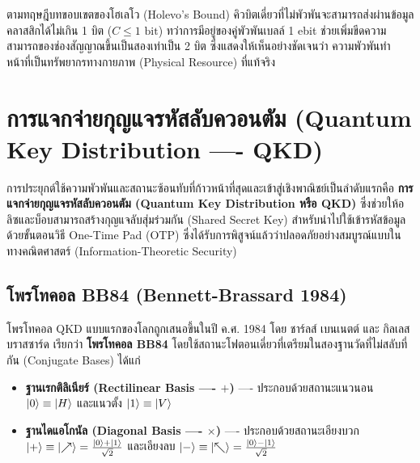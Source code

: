 ตามทฤษฎีบทขอบเขตของโฮเลโว (Holevo's Bound) คิวบิตเดี่ยวที่ไม่พัวพันจะสามารถส่งผ่านข้อมูลคลาสสิกได้ไม่เกิน 1 บิต ($C \le 1\text{ bit}$) ทว่าการมีอยู่ของคู่พัวพันเบลล์ 1 ebit ช่วยเพิ่มขีดความสามารถของช่องสัญญาณขึ้นเป็นสองเท่าเป็น 2 บิต ซึ่งแสดงให้เห็นอย่างชัดเจนว่า ความพัวพันทำหน้าที่เป็นทรัพยากรทางกายภาพ (Physical Resource) ที่แท้จริง

\section{การแจกจ่ายกุญแจรหัสลับควอนตัม (Quantum Key Distribution ---- QKD)}

การประยุกต์ใช้ความพัวพันและสถานะซ้อนทับที่ก้าวหน้าที่สุดและเข้าสู่เชิงพาณิชย์เป็นลำดับแรกคือ \textbf{การแจกจ่ายกุญแจรหัสลับควอนตัม (Quantum Key Distribution หรือ QKD)} ซึ่งช่วยให้อลิซและบ็อบสามารถสร้างกุญแจลับสุ่มร่วมกัน (Shared Secret Key) สำหรับนำไปใช้เข้ารหัสข้อมูลด้วยขั้นตอนวิธี One-Time Pad (OTP) ซึ่งได้รับการพิสูจน์แล้วว่าปลอดภัยอย่างสมบูรณ์แบบในทางคณิตศาสตร์ (Information-Theoretic Security)

\subsection{โพรโทคอล BB84 (Bennett-Brassard 1984)}
โพรโทคอล QKD แบบแรกของโลกถูกเสนอขึ้นในปี ค.ศ. 1984 โดย ชาร์ลส์ เบนเนตต์ และ กิลเลส บราสซาร์ด เรียกว่า \textbf{โพรโทคอล BB84} โดยใช้สถานะโฟตอนเดี่ยวที่เตรียมในสองฐานวัดที่ไม่สลับที่กัน (Conjugate Bases) ได้แก่
\begin{itemize}
    \item \textbf{ฐานเรกติลิเนียร์ (Rectilinear Basis ---- $+$)} ---- ประกอบด้วยสถานะแนวนอน $\ket{0} \equiv \ket{H}$ และแนวตั้ง $\ket{1} \equiv \ket{V}$
    \item \textbf{ฐานไดแอโกนัล (Diagonal Basis ---- $\times$)} ---- ประกอบด้วยสถานะเอียงบวก $\ket{+} \equiv \ket{\nearrow} = \frac{\ket{0}+\ket{1}}{\sqrt{2}}$ และเอียงลบ $\ket{-} \equiv \ket{\nwarrow} = \frac{\ket{0}-\ket{1}}{\sqrt{2}}$
\end{itemize}

